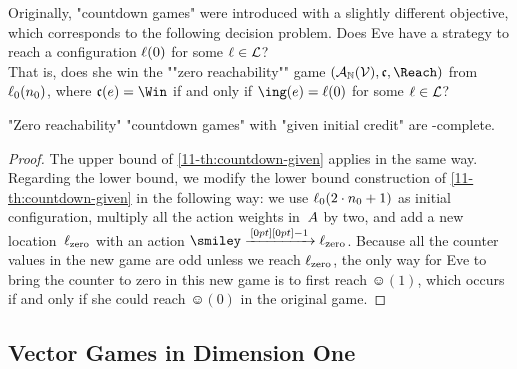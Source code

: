 \medskip
Originally, "countdown games" were introduced with a slightly
different objective, which corresponds to the following decision
problem.
\AP{}
  {Does Eve have a strategy to reach a configuration $\ell(0)$ for
  some $\ell\in\mathcal L$?\\That is, does she win the ""zero
  reachability""
  game $(\?A_\+N(\?V),\col,\Reach)$ from $\ell_0(n_0)$, where
  $\col(e)=\Win$ if and only if $\ing(e)=\loc(0)$ for some $\ell\in\mathcal L$?}
\begin{theorem}
\label{11-th:countdown-zero}
  "Zero reachability" "countdown games" with "given initial credit"
  are \EXP-complete.
\end{theorem}
\begin{proof}
  The upper bound of \cref{11-th:countdown-given} applies in the same
  way.  Regarding the lower bound, we modify the lower bound
  construction of \cref{11-th:countdown-given} in the following way: we
  use $\ell_0(2\cdot n_0+1)$ as initial configuration, multiply all
  the action weights in~$A$ by two, and add a new
  location~$\ell_\mathrm{zero}$ with an action
  $\smiley\step{-1}\loc_\mathrm{zero}$.  Because all the counter
  values in the new game are odd unless we reach $\ell_\mathrm{zero}$,
  the only way for Eve to bring the counter to zero in this new game
  is to first reach $\smiley(1)$, which occurs if and only if she
  could reach $\smiley(0)$ in the original game.
\end{proof}

\subsection{Vector Games in Dimension One}
\label{11-sec:one-counter}

